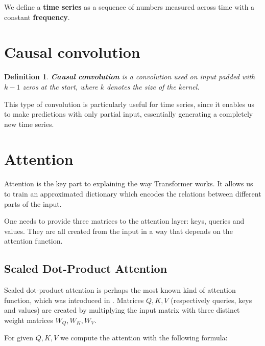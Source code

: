 \documentclass[en]{pracamgr}
\newtheorem{defi}{Definition}[section]
\begin{document}
%	
	We define a \textbf{time series} as a sequence of numbers measured across time with a constant \textbf{frequency}.

\section{Causal convolution}
\begin{defi}\label{ts}
\textbf{Causal convolution} is a convolution used on input padded with $k - 1$ zeros at the start, where $k$ denotes the size of the kernel.
	
\end{defi}

This type of convolution is particularly useful for time series, since it enables us to make predictions with only partial input, essentially generating a completely new time series.


\section{Attention}

Attention is the key part to explaining the way Transformer works. It allows us to train an approximated dictionary which encodes the relations between different parts of the input.

One needs to provide three matrices to the attention layer: keys, queries and values. They are all created from the input in a way that depends on the attention function.


\subsection{Scaled Dot-Product Attention}

Scaled dot-product attention is perhaps the most known kind of attention function, which was introduced in \cite{tr}. Matrices $Q, K, V$ (respectively queries, keys and values) are created by multiplying the input matrix with three distinct weight matrices $W_Q, W_K, W_V$.

For given $Q, K, V$ we compute the attention with the following formula:
\end{document}
